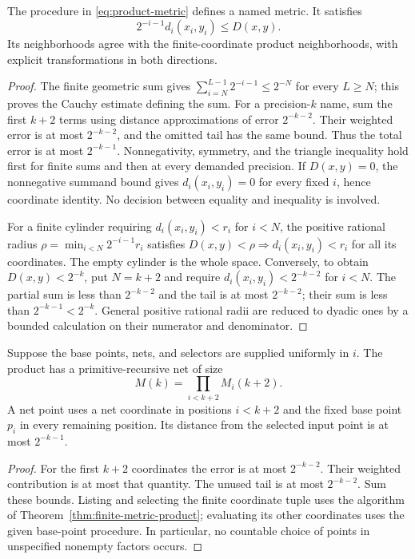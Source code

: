 \begin{theorem}
\label{thm:weighted-product}
The procedure in \eqref{eq:product-metric} defines a named metric.
It satisfies
\begin{equation}\label{eq:coordinate-bound}
 2^{-i-1}d_i(x_i,y_i)\leq D(x,y).
\end{equation}
Its neighborhoods agree with the finite-coordinate product neighborhoods,
with explicit transformations in both directions.
\end{theorem}
\begin{proof}
The finite geometric sum gives
$\sum_{i=N}^{L-1}2^{-i-1}\leq 2^{-N}$ for every $L\geq N$;
this proves the Cauchy estimate defining the sum.  For a precision-$k$
name, sum the first $k+2$ terms using distance approximations of error
$2^{-k-2}$.  Their weighted error is at most $2^{-k-2}$, and the omitted
tail has the same bound.  Thus the total error is at most $2^{-k-1}$.
Nonnegativity, symmetry, and the triangle inequality hold first for finite
sums and then at every demanded precision.  If $D(x,y)=0$, the nonnegative
summand bound gives $d_i(x_i,y_i)=0$ for every fixed $i$, hence coordinate
identity.  No decision between equality and inequality is involved.

For a finite cylinder requiring $d_i(x_i,y_i)<r_i$ for $i<N$, the positive
rational radius
$\rho=\min_{i<N}2^{-i-1}r_i$ satisfies
$D(x,y)<\rho\Rightarrow d_i(x_i,y_i)<r_i$ for all its coordinates.
The empty cylinder is the whole space.  Conversely, to obtain
$D(x,y)<2^{-k}$, put $N=k+2$ and require
$d_i(x_i,y_i)<2^{-k-2}$ for $i<N$.  The partial sum is less than
$2^{-k-2}$ and the tail is at most $2^{-k-2}$; their sum is less than
$2^{-k-1}<2^{-k}$.  General positive rational radii are reduced to dyadic
ones by a bounded calculation on their numerator and denominator.
\end{proof}

\begin{theorem}
\label{thm:countable-net-product}
Suppose the base points, nets, and selectors are supplied uniformly in
$i$.  The product has a primitive-recursive net of size
\begin{equation}\label{eq:product-net-size}
 M(k)=\prod_{i<k+2}M_i(k+2).
\end{equation}
A net point uses a net coordinate in positions $i<k+2$ and the fixed base
point $p_i$ in every remaining position.  Its distance from the selected
input point is at most $2^{-k-1}$.
\end{theorem}
\begin{proof}
For the first $k+2$ coordinates the error is at most $2^{-k-2}$.
Their weighted contribution is at most that quantity.  The unused tail
is at most $2^{-k-2}$.  Sum these bounds.  Listing and selecting the finite
coordinate tuple uses the algorithm of
Theorem~\ref{thm:finite-metric-product}; evaluating its other coordinates
uses the given base-point procedure.  In particular, no countable choice
of points in unspecified nonempty factors occurs.
\end{proof}

